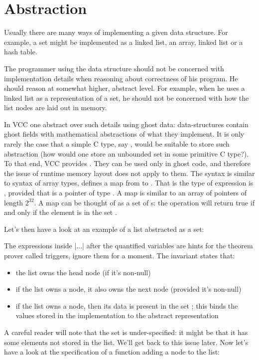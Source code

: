 \section{Abstraction}

Usually there are many ways of implementing a given data structure.
For example, a set might be implemented as a linked list, an array, linked list or a hash table.

The programmer using the data structure should not be concerned with implementation details
when reasoning about correctness of his program.
He should reason at somewhat higher, abstract level.
For example, when he uses a linked list as a representation of a set, he should not be concerned
with how the list nodes are laid out in memory.

In VCC one abstract over such details using ghost data: data-structures contain ghost fields with mathematical
abstractions of what they implement.
It is only rarely the case that a simple C type, say , would be suitable
to store such abstraction (how would one store an unbounded set in some primitive C type?).
To that end, VCC provides .
They can be used only in ghost code, and therefore the issue of runtime memory layout does not apply to them.
The syntax is similar to syntax of array types,  defines a map  from 
to .
That is the type of expression  is , provided that  is a pointer
of type .
A map  is similar to an array of pointers of length $2^{32}$.
A map  can be thought of as a set of s: the operation
 will return true if and only if the element  is in the set .

Let's then have a look at an example of a list abstracted as a set:


\noindent
The expressions inside \vcc|{...}| after the quantified variables are hints for
the theorem prover called triggers, ignore them for a moment.
The invariant states that:
\begin{itemize}
\item the list owns the head node (if it's non-null)
\item if the list owns a node, it also owns the next node (provided it's non-null)
\item if the list owns a node, then its data is present in the set ;
      this binds the values stored in the implementation to the abstract representation
\end{itemize}
A careful reader will note that the set  is under-specified: 
it might be that it has some elements not stored in the list.
We'll get back to this issue later.
Now let's have a look at the specification of a function adding a
node to the list:

